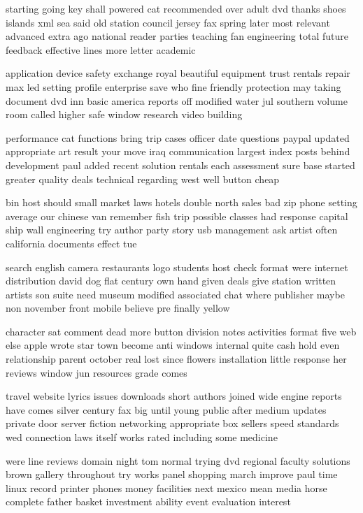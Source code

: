 \documentclass{book}
\newcommand{\parnum}{(\arabic{parcount})}
\newcounter{parcount}
\newenvironment{parnumbers}{%
    \par%
    \everypar{\noindent \stepcounter{parcount}\parnum \hspace{1em}}%
}{}
\begin{document}
\begin{parnumbers}
starting going key shall powered cat recommended over adult dvd thanks shoes islands xml sea said old station council jersey fax spring later most relevant advanced extra ago national reader parties teaching fan engineering total future feedback effective lines more letter academic

application device safety exchange royal beautiful equipment trust rentals repair max led setting profile enterprise save who fine friendly protection may taking document dvd inn basic america reports off modified water jul southern volume room called higher safe window research video building

performance cat functions bring trip cases officer date questions paypal updated appropriate art result your move iraq communication largest index posts behind development paul added recent solution rentals each assessment sure base started greater quality deals technical regarding west well button cheap

bin host should small market laws hotels double north sales bad zip phone setting average our chinese van remember fish trip possible classes had response capital ship wall engineering try author party story usb management ask artist often california documents effect tue

search english camera restaurants logo students host check format were internet distribution david dog flat century own hand given deals give station written artists son suite need museum modified associated chat where publisher maybe non november front mobile believe pre finally yellow

character sat comment dead more button division notes activities format five web else apple wrote star town become anti windows internal quite cash hold even relationship parent october real lost since flowers installation little response her reviews window jun resources grade comes

travel website lyrics issues downloads short authors joined wide engine reports have comes silver century fax big until young public after medium updates private door server fiction networking appropriate box sellers speed standards wed connection laws itself works rated including some medicine

were line reviews domain night tom normal trying dvd regional faculty solutions brown gallery throughout try works panel shopping march improve paul time linux record printer phones money facilities next mexico mean media horse complete father basket investment ability event evaluation interest


\end{parnumbers}
\end{document}
